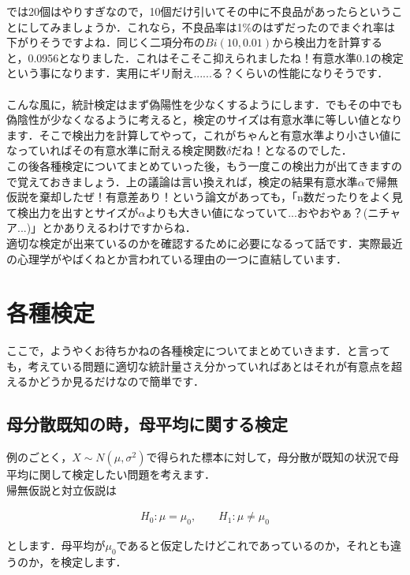 \documentclass[11pt,a4paper]{ujreport} 	%
\begin{document}
では20個はやりすぎなので，10個だけ引いてその中に不良品があったらということにしてみましょうか．これなら，不良品率は1\%のはずだったのでまぐれ率は下がりそうですよね．同じく二項分布の$Bi(10,0.01)$から検出力を計算すると，0.0956となりました．これはそこそこ抑えられましたね！有意水準0.1の検定という事になります．実用にギリ耐え......る？くらいの性能になりそうです．\\
\\

こんな風に，統計検定はまず偽陽性を少なくするようにします．でもその中でも偽陰性が少なくなるように考えると，検定のサイズは有意水準に等しい値となります．そこで検出力を計算してやって，これがちゃんと有意水準より小さい値になっていればその有意水準に耐える検定関数$\delta$だね！となるのでした．\\

この後各種検定についてまとめていった後，もう一度この検出力が出てきますので覚えておきましょう．上の議論は言い換えれば，検定の結果有意水準$\alpha$で帰無仮説を棄却したぜ！有意差あり！という論文があっても，「n数だったりをよく見て検出力を出すとサイズが$\alpha$よりも大きい値になっていて...おやおやぁ？(ニチャア...)」とかありえるわけですからね．\\

適切な検定が出来ているのかを確認するために必要になるって話です．実際最近の心理学がやばくねとか言われている理由の一つに直結しています．

\section{各種検定}
ここで，ようやくお待ちかねの各種検定についてまとめていきます．と言っても，考えている問題に適切な統計量さえ分かっていればあとはそれが有意点を超えるかどうか見るだけなので簡単です．


\subsection{母分散既知の時，母平均に関する検定}
例のごとく，$X \sim N(\mu, \sigma^2)$で得られた標本に対して，母分散が既知の状況で母平均に関して検定したい問題を考えます．\\

帰無仮説と対立仮説は

\begin{align}
  H_0 : \mu = \mu_0, \qquad H_1 : \mu \neq \mu_0
\end{align}

とします．母平均が$\mu_0$であると仮定したけどこれであっているのか，それとも違うのか，を検定します．\\
\end{document}
